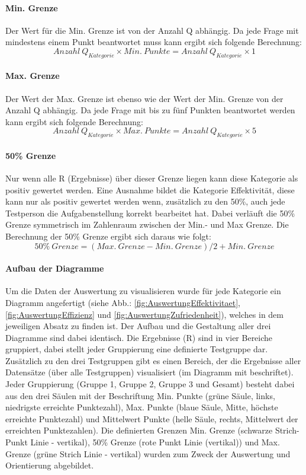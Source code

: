 \documentclass[Bachelorarbeit.tex]{subfiles}
\begin{document}
\paragraph{Min. Grenze} Der Wert für die Min. Grenze ist von der Anzahl Q abhängig. Da jede Frage mit mindestens einem Punkt beantwortet muss kann ergibt sich folgende Berechnung:
\[
Anzahl \: Q_{Kategorie} \times Min. \: Punkte = Anzahl \: Q_{Kategorie} \times 1
\]

\paragraph{Max. Grenze} Der Wert der Max. Grenze ist ebenso wie der Wert der Min. Grenze von der Anzahl Q abhängig. 
Da jede Frage mit bis zu fünf Punkten beantwortet werden kann ergibt sich folgende Berechnung:
\[
Anzahl \: Q_{Kategorie} \times Max. \: Punkte = Anzahl \: Q_{Kategorie} \times 5 
\]

\paragraph{50\% Grenze} Nur wenn alle R (Ergebnisse) über dieser Grenze liegen kann diese Kategorie als positiv gewertet werden. 
Eine Ausnahme bildet die Kategorie Effektivität, diese kann nur als positiv gewertet werden wenn, zusätzlich zu den 50\%, auch jede Testperson die Aufgabenstellung korrekt bearbeitet hat.
Dabei verläuft die 50\% Grenze symmetrisch im Zahlenraum zwischen der Min.- und Max Grenze.
Die Berechnung der 50\% Grenze ergibt sich daraus wie folgt:
\[
50 \% \: Grenze = (Max. \: Grenze - Min. \: Grenze) / 2 + Min. \: Grenze
\]


\paragraph{Aufbau der Diagramme} \label{AufbauDiagramm} Um die Daten der Auswertung zu visualisieren wurde für jede Kategorie ein Diagramm angefertigt (siehe Abb.: \ref{fig:AuswertungEffektivitaet}, \ref{fig:AuswertungEffizienz} und \ref{fig:AuswertungZufriedenheit}), welches in dem jeweiligen Absatz zu finden ist.
Der Aufbau und die Gestaltung aller drei Diagramme sind dabei identisch.
Die Ergebnisse (R) sind in vier Bereiche gruppiert, dabei stellt jeder Gruppierung eine definierte Testgruppe dar. 
Zusätzlich zu den drei Testgruppen gibt es einen Bereich, der die Ergebnisse aller Datensätze (über alle Testgruppen) visualisiert (im Diagramm mit  beschriftet). 
Jeder Gruppierung (Gruppe 1, Gruppe 2, Gruppe 3 und Gesamt) besteht dabei aus den drei Säulen mit der Beschriftung Min. Punkte (grüne Säule, links, niedrigste erreichte Punktezahl), Max. Punkte (blaue Säule, Mitte, höchste erreichte Punktezahl) und Mittelwert Punkte (helle Säule, rechts, Mittelwert der erreichten Punktezahlen). 
Die definierten Grenzen Min. Grenze (schwarze Strich-Punkt Linie - vertikal), 50\% Grenze (rote Punkt Linie (vertikal)) und Max. Grenze (grüne Strich Linie - vertikal) wurden zum Zweck der Auswertung und Orientierung abgebildet.
\end{document}
